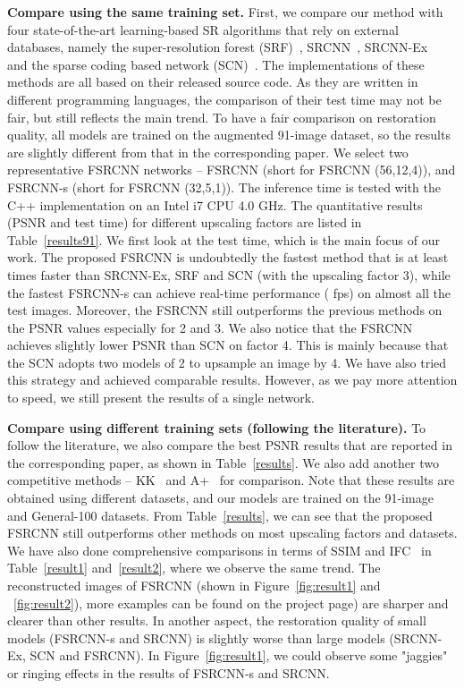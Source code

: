 \documentclass[runningheads]{llncs}
\begin{document}
\textbf{Compare using the same training set.} First, we compare our method with four state-of-the-art learning-based SR algorithms that rely on external databases, namely the super-resolution forest (SRF)~\cite{Schulter2015}, SRCNN~\cite{Dong2014}, SRCNN-Ex~\cite{Dong2015} and the sparse coding based network (SCN)~\cite{Wang2015}. The implementations of these methods are all based on their released source code. As they are written in different programming languages, the comparison of their test time may not be fair, but still reflects the main trend. To have a fair comparison on restoration quality, all models are trained on the augmented 91-image dataset, so the results are slightly different from that in the corresponding paper. We select two representative FSRCNN networks -- FSRCNN (short for FSRCNN (56,12,4)), and FSRCNN-s (short for FSRCNN (32,5,1)). The inference time is tested with the C++ implementation on an Intel i7 CPU 4.0 GHz.
The quantitative results (PSNR and test time) for different upscaling factors are listed in Table~\ref{results91}. We first look at the test time, which is the main focus of our work. The proposed FSRCNN is undoubtedly the fastest method that is at least  times faster than SRCNN-Ex, SRF and SCN (with the upscaling factor 3),  while the fastest FSRCNN-s can achieve real-time performance ( fps) on almost all the test images. Moreover, the FSRCNN still outperforms the previous methods on the PSNR values especially for 2 and 3. We also notice that the FSRCNN achieves slightly lower PSNR than SCN on factor 4. This is mainly because that the SCN adopts two models of 2 to upsample an image by 4. We have also tried this strategy and achieved comparable results. However, as we pay more attention to speed, we still present the results of a single network.

\noindent
\textbf{Compare using different training sets (following the literature).} To follow the literature, we also compare the best PSNR results that are reported in the corresponding paper, as shown in Table~\ref{results}. We also add another two competitive methods -- KK~\cite{Kim2010} and A+~\cite{Timofte2014} for comparison. Note that these results are obtained using different datasets, and our models are trained on the 91-image and General-100 datasets. From Table~\ref{results}, we can see that the proposed FSRCNN still outperforms other methods on most upscaling factors and datasets. We have also done comprehensive comparisons in terms of SSIM and IFC~\cite{sheikh2005information} in Table~\ref{result1} and~\ref{result2}, where we observe the same trend. The reconstructed images of FSRCNN (shown in Figure~\ref{fig:result1} and ~\ref{fig:result2}), more examples can be found on the project page) are sharper and clearer than other results. In another aspect, the restoration quality of small models (FSRCNN-s and SRCNN) is slightly worse than large models (SRCNN-Ex, SCN and FSRCNN). In Figure~\ref{fig:result1}, we could observe some "jaggies" or ringing effects in the results of FSRCNN-s and SRCNN.
\end{document}
